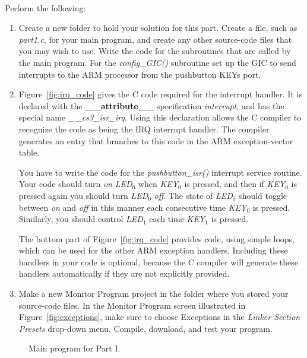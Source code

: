 \documentclass[epsfig,10pt,fullpage]{article}
\begin{document}
~\\
\noindent
Perform the following:

\begin{enumerate}
\item Create a new folder to hold your solution for this part. Create a
file, such as {\it part1.c}, for your main program, and create any other source-code files 
that you may wish to use.  Write the code for the subroutines that are called by the 
main program. For the {\it config\_GIC()} subroutine set up the
GIC to send interrupts to the ARM processor from the pushbutton KEYs port. 

\item 
Figure~\ref{fig:irq_code} gives the C code required for the interrupt handler. 
It is declared with the {\bf \_$\,$\_attribute\_$\,$\_} specification {\it interrupt}, 
and has the special name 
{\it \_$\,$\_cs3\_isr\_irq}.  Using this declaration allows the C compiler to recognize the 
code as being the IRQ interrupt handler. The compiler generates an entry that branches to
this code in the ARM exception-vector table. 
  
You have to write the code for the {\it pushbutton\_isr()} interrupt service routine.
Your code should turn {\it on} {\it LED}$_0$ when {\it KEY}$_0$ is pressed, and then 
if {\it KEY}$_0$ is pressed again you should turn {\it LED}$_0$ {\it off}. The state 
of {\it LED}$_0$ should toggle between {\it on} and {\it off} in this manner each consecutive
time {\it KEY}$_0$ is pressed. Similarly, you should control {\it LED}$_1$ each time 
{\it KEY}$_1$ is pressed.

The bottom part of Figure~\ref{fig:irq_code} provides code, using simple loops, which can 
be used for the other ARM exception handlers. Including these handlers in your code is 
optional, because the C compiler will generate these handlers automatically if they are 
not explicitly provided. 

\item
Make a new Monitor Program project in the folder where you stored your source-code files.
In the Monitor Program screen illustrated in Figure~\ref{fig:exceptions}, make sure 
to choose {\sf Exceptions} in the {\it Linker Section Presets} drop-down menu.
Compile, download, and test your program. 
\end{enumerate}

\begin{figure}[H]
\begin{center}

\end{center}
\caption{Main program for Part I.}
\label{fig:code}
\end{figure}
\end{document}
